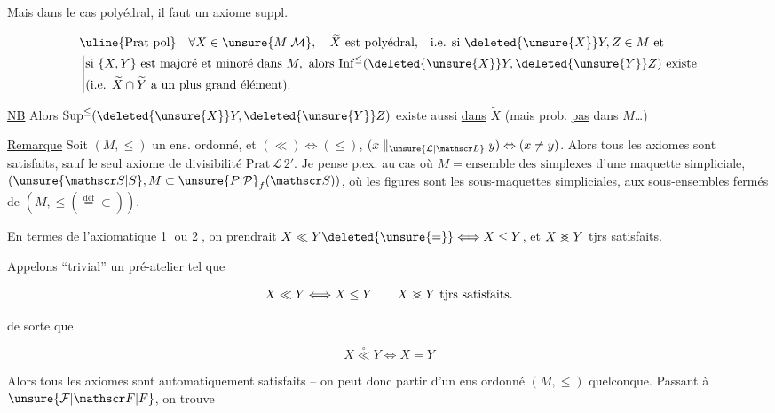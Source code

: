 
Mais dans le cas polyédral, il faut un axiome suppl.

\[
\begin{aligned}
&\text{\uline{Prat pol}}\quad \forall X\in\unsure{M|\mathcal M},\quad \widetilde X\ \text{est polyédral,}\quad \text{i.e. si } \deleted{\unsure{X}}Y,Z\in M\ \text{et}\\
&\left\lvert\begin{aligned}
&\text{si }\{X,Y\}\ \text{est majoré et minoré dans }M,\ \text{alors }\mathrm{Inf}^{\leq}(\deleted{\unsure{X}}Y,\deleted{\unsure{Y}}Z)\ \text{existe}\\
&(\text{i.e. }\widetilde X\cap\widetilde Y\ \text{a un plus grand élément}).
\end{aligned}\right.
\end{aligned}
\]

\uline{NB} Alors $\mathrm{Sup}^{\leq}(\deleted{\unsure{X}}Y,\deleted{\unsure{Y}}Z)$ existe aussi \uline{dans} $\widetilde X$ (mais prob.  \uline{pas} dans $M$\ldots)

\uline{Remarque} Soit $(M,\leq)$ un ens. ordonné, et  $(\ll)\Leftrightarrow(\leq)$, $(x\parallel_{\unsure{\mathcal L|\mathscr L}}y)\Leftrightarrow(x\ne y)$. Alors tous les axiomes sont satisfaits, sauf le seul axiome de divisibilité $\mathrm{Prat}\,\mathcal L\,2'$. Je pense p.ex. au cas où $M={}\text{ensemble des simplexes}$ d'une maquette simpliciale, $(\unsure{\mathscr S|S},M\subset\unsure{P|\mathcal P}_{f}(\mathscr S))$, où les figures sont les sous-maquettes simpliciales,  aux sous-ensembles fermés de $(M,\leq(\overset{\mathrm{déf}}{=}\subset))$.

En termes de l'axiomatique \textcircled{1} ou \textcircled{2}, on prendrait $X\ll Y\deleted{\unsure{=} }\Longleftrightarrow X\leq Y$, et $X\mathrel{>\mkern-13mu<}Y$ tjrs satisfaits. 

Appelons ``trivial'' un  pré-atelier tel que

\[
X\ll Y\Longleftrightarrow X\leq Y\qquad X\mathrel{>\mkern-13mu<}Y\ \text{tjrs satisfaits.}
\]

de sorte que

\[
X\overset{\circ}{\ll}Y\Longleftrightarrow X=Y
\]

Alors tous les axiomes  sont automatiquement satisfaits -- on peut donc partir d'un  ens ordonné $(M,\leq)$ quelconque. Passant à $\unsure{\mathcal F|\mathscr F|F}$, on trouve 

